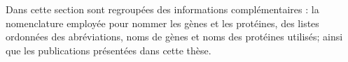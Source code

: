 \singlespacing

		\begin{center}
			\begin{tcolorbox}[colback=black!5!white,colframe=white!15!black,arc=0mm]
				\sffamily
				Dans cette section sont regroupées des informations complémentaires : la nomenclature employée pour nommer les gènes et les protéines, des listes ordonnées des abréviations, noms de gènes et noms des protéines utilisés; ainsi que les publications présentées dans cette thèse.
			\end{tcolorbox}
			\vspace{5ex}
			\minitoc
		\end{center}